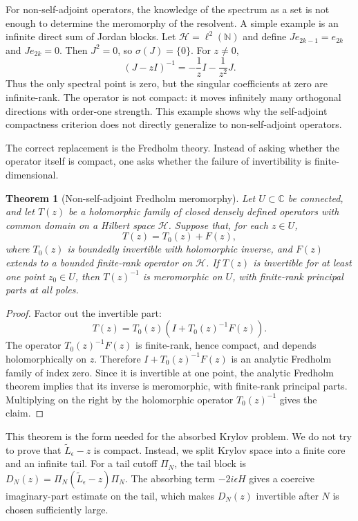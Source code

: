 \documentclass[JHEP,12pt]{article}
\newtheorem{theorem}[lemma]{Theorem}
\begin{document}
For non-self-adjoint operators, the knowledge of the spectrum as a set is not enough to determine the meromorphy of the resolvent. A simple
example is an infinite direct sum of Jordan blocks. Let $\mathcal H=\ell^2(\mathbb{N})$ and define \(J e_{2k-1}=e_{2k}\) and \(J e_{2k}=0\). Then \(J^2=0\), so
\(\sigma(J)=\{0\}\). For \(z\neq 0\),
\[
(J-zI)^{-1}=-\frac{1}{z}I-\frac{1}{z^2}J .
\]
Thus the only spectral point is zero, but the singular coefficients at zero
are infinite-rank. The operator is not compact: it moves infinitely many
orthogonal directions with order-one strength. This example shows why the
self-adjoint compactness criterion does not directly generalize to
non-self-adjoint operators.

The correct replacement is the Fredholm theory. Instead of asking whether the
operator itself is compact, one asks whether the failure of invertibility is
finite-dimensional.

\begin{theorem}[Non-self-adjoint Fredholm meromorphy]
Let \(U\subset\mathbb C\) be connected, and let \(T(z)\) be a holomorphic
family of closed densely defined operators with common domain on a Hilbert
space \(\mathcal H\). Suppose that, for each \(z\in U\),
\[
T(z)=T_0(z)+F(z),
\]
where \(T_0(z)\) is boundedly invertible with holomorphic inverse, and \(F(z)\)
extends to a bounded finite-rank operator on \(\mathcal H\). If \(T(z)\) is
invertible for at least one point \(z_0\in U\), then \(T(z)^{-1}\) is
meromorphic on \(U\), with finite-rank principal parts at all poles.
\end{theorem}

\begin{proof}
Factor out the invertible part:
\[
T(z)=T_0(z)\left(I+T_0(z)^{-1}F(z)\right).
\]
The operator \(T_0(z)^{-1}F(z)\) is finite-rank, hence compact, and depends
holomorphically on \(z\). Therefore \(I+T_0(z)^{-1}F(z)\) is an analytic
Fredholm family of index zero. Since it is invertible at one point, the
analytic Fredholm theorem implies that its inverse is meromorphic, with
finite-rank principal parts. Multiplying on the right by the holomorphic
operator \(T_0(z)^{-1}\) gives the claim.
\end{proof}

This theorem is the form needed for the absorbed Krylov problem. We do not try
to prove that \(\widetilde L_\epsilon-z\) is compact. Instead, we split Krylov
space into a finite core and an infinite tail. For a tail cutoff \(\Pi_N\), the
tail block is \(D_N(z)=\Pi_N(\widetilde L_\epsilon-z)\Pi_N\). The absorbing
term \(-2i\epsilon H\) gives a coercive imaginary-part estimate on the tail,
which makes \(D_N(z)\) invertible after \(N\) is chosen sufficiently large.
\end{document}
